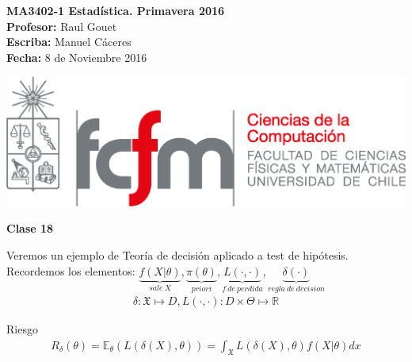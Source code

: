 \documentclass[10pt]{article}
\theoremstyle{plain}
\theoremstyle{definition}
\newcommand{\catnum}{18} %
\newcommand{\fecha}{8 de Noviembre 2016 }
\begin{document}
\vspace*{-1.2 cm}
\begin{minipage}{0.6\textwidth}
\begin{flushleft}
\hspace*{-0.5cm}\textbf{MA3402-1 Estadística. Primavera 2016}\\
\hspace*{-0.5cm}\textbf{Profesor:} Raul Gouet\\
\hspace*{-0.5cm}\textbf{Escriba:} Manuel Cáceres\\
\hspace*{-0.5cm}\textbf{Fecha:} \fecha
\end{flushleft}
\end{minipage}
\begin{minipage}{0.36\textwidth}
\begin{flushright}
\includegraphics[scale=0.3]{imagenes/fcfm_dcc}
\end{flushright}
\end{minipage}
\bigskip

\begin{center}
\LARGE\textbf{Clase \catnum}
\end{center}
Veremos un ejemplo de Teoría de decisión aplicado a test de hipótesis.\\

Recordemos los elementos: $\underbrace{f(X|\theta)}_{sale\ X} , \underbrace{\pi(\theta)}_{priori}, \underbrace{L(\cdot,\cdot)}_{f\ de\ perdida}, \underbrace{\delta(\cdot)}_{regla\ de\ decision}$
\begin{align*}
\delta\colon \mathfrak{X} \mapsto D, L(\cdot,\cdot)\colon D \times \Theta \mapsto \mathbb{R}
\end{align*}

Riesgo
\begin{align*}
R_{\delta}(\theta) = \mathbb{E}_{\theta}(L(\delta(X),\theta)) = \int_{\mathfrak{X}} L(\delta(X), \theta) f(X|\theta) dx
\end{align*}
\end{document}
